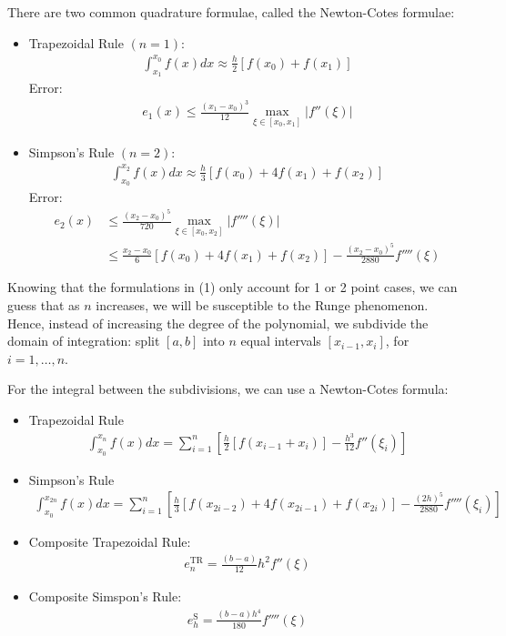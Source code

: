 \documentclass{article}
\begin{document}
There are two common quadrature formulae, called the Newton-Cotes formulae:
\begin{itemize}
\item Trapezoidal Rule $(n=1)$:
  \begin{align*}
    \int_{x_1}^{x_0}f(x)dx \approx \frac{h}{2} \left[f(x_0) + f(x_1)\right]
  \end{align*}
  Error:
  \begin{align*}
    e_1(x) \leq \frac{(x_1 - x_0)^3}{12}\max_{\xi \in [x_0, x_1]}|f''(\xi)|
  \end{align*}
\item Simpson's Rule $(n=2)$:
  \begin{align*}
    \int_{x_0}^{x_2}f(x)dx \approx \frac{h}{3} \left[f(x_0)+4f(x_1) + f(x_2)\right]
  \end{align*}
  Error:
  \begin{align*}
    e_2(x) &\leq \frac{(x_2 - x_0)^5}{720}\max_{\xi \in [x_0, x_2]}|f''''(\xi)|\\
           &\leq \frac{x_2-x_0}{6} \left[f(x_0) + 4f(x_1) + f(x_2)\right] - \frac{(x_2 - x_0)^5}{2880}f''''(\xi)
  \end{align*}
\end{itemize}

 Knowing that the formulations in (1) only account for 1 or 2 point cases, we can guess that as $n$ increases, we will be susceptible to the Runge phenomenon. Hence, instead of increasing the degree of the polynomial, we subdivide the domain of integration: split $[a, b]$ into $n$ equal intervals $[x_{i-1}, x_i]$, for $i = 1, \ldots, n$.

For the integral between the subdivisions, we can use a Newton-Cotes formula:
\begin{itemize}
\item Trapezoidal Rule
\begin{align*}
  \int_{x_0}^{x_n}f(x)dx = \sum_{i=1}^{n} \left[\frac{h}{2} \left[f(x_{i-1} +x_i)\right] - \frac{h^3}{12}f''(\xi_i) \right]
\end{align*}
\item Simpson's Rule
  \begin{align*}
    \int_{x_0}^{x_{2n}}f(x)dx = \sum_{i=1}^{n} \left[\frac{h}{3} \left[f(x_{2i - 2}) + 4f(x_{2i - 1}) + f(x_{2i})\right] - \frac{(2h)^5}{2880}f''''(\xi_i)\right]    
  \end{align*}
\end{itemize}

\begin{itemize}
\item Composite Trapezoidal Rule:
  \begin{align*}
    e_n^{\text{TR}} = \frac{(b-a)}{12}h^2 f''(\xi)
  \end{align*}
\item Composite Simspon's Rule:
  \begin{align*}
    e_h^\text{S} = \frac{(b-a)h^4}{180}f''''(\xi)
  \end{align*}
\end{itemize}
\end{document}
